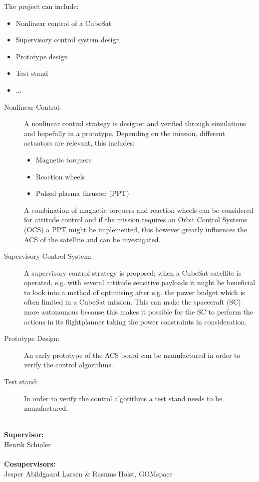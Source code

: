 The project can include:
\begin{itemize}\tightlist
  \item Nonlinear control of a CubeSat
  \item Supervisory control system design
  \item Prototype design
  \item Test stand
  \item ...
\end{itemize}

\begin{description}
  \item[Nonlinear Control:] A nonlinear control strategy is designet and verified through simulations and hopefully in a prototype. Depending on the mission, different actuators are relevant, this includes:
    \begin{itemize}\tightlist
      \item Magnetic torquers
      \item Reaction wheels
      \item Pulsed plasma thruster (PPT)
    \end{itemize}
    A combination of magnetic torquers and reaction wheels can be considered for attitude control and if the mission requires an Orbit Control Systems (OCS) a PPT might be implemented, this however greatly influences the ACS of the satellite and can be investigated.
  \item[Supervisory Control System:] A supervisory control strategy is proposed; when a CubeSat satellite is operated, e.g. with several attitude sensitive payloads it might be beneficial to look into a method of optimising after e.g. the power budget which is often limited in a CubeSat mission. This can make the spacecraft (SC) more autonomous because this makes it possible for the SC to perform the actions in its flightplanner taking the power constraints in consideration.
  \item[Prototype Design:] An early prototype of the ACS board can be manufactured in order to verify the control algorithms.
  \item[Test stand:] In order to verify the control algorithms a test stand needs to be manufactured.
\end{description}
\vspace{2cm}
~\\
\textbf{Supervisor:}\\
Henrik Schiøler\\ ~\\
\textbf{Cosupervisors:}\\
Jesper Abildgaard Larsen \& Rasmus Holst, GOMspace
